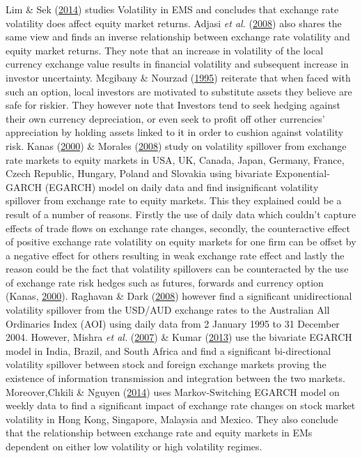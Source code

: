 \documentclass[11pt,preprint, authoryear]{elsarticle}
\numberwithin{equation}{section}
\numberwithin{figure}{section}
\numberwithin{table}{section}
\begin{document}
Lim \& Sek (\protect\hyperlink{ref-lim2014}{2014}) studies Volatility in
EMS and concludes that exchange rate volatility does affect equity
market returns. Adjasi \emph{et al.}
(\protect\hyperlink{ref-adjasi2008}{2008}) also shares the same view and
finds an inverse relationship between exchange rate volatility and
equity market returns. They note that an increase in volatility of the
local currency exchange value results in financial volatility and
subsequent increase in investor uncertainty. Mcgibany \& Nourzad
(\protect\hyperlink{ref-mcgibany1995}{1995}) reiterate that when faced
with such an option, local investors are motivated to substitute assets
they believe are safe for riskier. They however note that Investors tend
to seek hedging against their own currency depreciation, or even seek to
profit off other currencies' appreciation by holding assets linked to it
in order to cushion against volatility risk. Kanas
(\protect\hyperlink{ref-kanas2000}{2000}) \& Morales
(\protect\hyperlink{ref-morales2008}{2008}) study on volatility
spillover from exchange rate markets to equity markets in USA, UK,
Canada, Japan, Germany, France, Czech Republic, Hungary, Poland and
Slovakia using bivariate Exponential-GARCH (EGARCH) model on daily data
and find insignificant volatility spillover from exchange rate to equity
markets. This they explained could be a result of a number of reasons.
Firstly the use of daily data which couldn't capture effects of trade
flows on exchange rate changes, secondly, the counteractive effect of
positive exchange rate volatility on equity markets for one firm can be
offset by a negative effect for others resulting in weak exchange rate
effect and lastly the reason could be the fact that volatility
spillovers can be counteracted by the use of exchange rate risk hedges
such as futures, forwards and currency option (Kanas,
\protect\hyperlink{ref-kanas2000}{2000}). Raghavan \& Dark
(\protect\hyperlink{ref-raghavan2008}{2008}) however find a significant
unidirectional volatility spillover from the USD/AUD exchange rates to
the Australian All Ordinaries Index (AOI) using daily data from 2
January 1995 to 31 December 2004. However, Mishra \emph{et al.}
(\protect\hyperlink{ref-mishra2007}{2007}) \& Kumar
(\protect\hyperlink{ref-kumar2013}{2013}) use the bivariate EGARCH model
in India, Brazil, and South Africa and find a significant bi-directional
volatility spillover between stock and foreign exchange markets proving
the existence of information transmission and integration between the
two markets. Moreover,Chkili \& Nguyen
(\protect\hyperlink{ref-chkili2014}{2014}) uses Markov-Switching EGARCH
model on weekly data to find a significant impact of exchange rate
changes on stock market volatility in Hong Kong, Singapore, Malaysia and
Mexico. They also conclude that the relationship between exchange rate
and equity markets in EMs dependent on either low volatility or high
volatility regimes.
\end{document}
